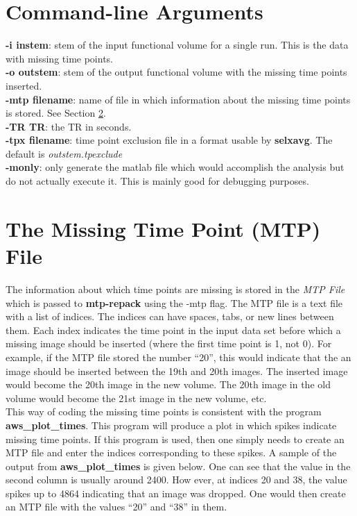 \documentclass[10pt]{article}
\begin{document}
\section{Command-line Arguments}

\noindent
{\bf -i instem}: stem of the input functional volume for a single run.
This is the data with missing time points.\\

\noindent
{\bf -o outstem}: stem of the output functional volume with the
missing time points inserted.\\

\noindent
{\bf -mtp filename}: name of file in which information about the
missing time points is stored. See Section \ref{mtp.sec}.\\

\noindent
{\bf -TR TR}: the TR in seconds.\\

\noindent
{\bf -tpx filename}: time point exclusion file in a format usable by
{\bf selxavg}. The default is {\em outstem.tpexclude}\\

\noindent
{\bf -monly}: only generate the matlab file which would accomplish the
analysis but do not actually execute it.  This is mainly good for
debugging purposes.\\

\section{The Missing Time Point (MTP) File}
\label{mtp.sec}

The information about which time points are missing is stored in the
{\em MTP File} which is passed to {\bf mtp-repack} using the -mtp
flag.  The MTP file is a text file with a list of indices. The indices
can have spaces, tabs, or new lines between them. Each index indicates
the time point in the input data set before which a missing image
should be inserted (where the first time point is 1, not 0).  For
example, if the MTP file stored the number ``20'', this would indicate
that the an image should be inserted between the 19th and 20th images.
The inserted image would become the 20th image in the new volume.  The
20th image in the old volume would become the 21st image in the new
volume, etc.  \\

This way of coding the missing time points is consistent with the
program {\bf aws\_plot\_times}.  This program will produce a plot in
which spikes indicate missing time points.  If this program is used,
then one simply needs to create an MTP file and enter the indices
corresponding to these spikes.  A sample of the output from {\bf
aws\_plot\_times} is given below.  One can see that the value in the
second column is usually around 2400.  How ever, at indices 20 and
38, the value spikes up to 4864 indicating that an image was dropped.
One would then create an MTP file with the values ``20'' and ``38'' in
them.  
\end{document}
